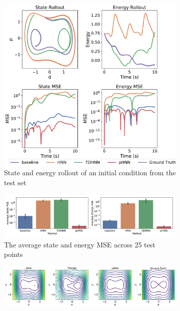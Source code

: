 \documentclass{article}
\begin{document}
\begin{figure}[!htb]
\centering
\captionsetup{justification=centering}
\begin{subfigure}[b]{0.48\textwidth}
\includegraphics[width=\textwidth]{figures/figures/duffing/1/duffing_long_0.pdf}
\caption{State and energy rollout of an initial condition from the test set}
\end{subfigure}
\begin{subfigure}[b]{0.48\textwidth}
\includegraphics[width=\textwidth]{figures/figures/duffing/1/duffing_errors_0.pdf}
\caption{The average state and energy MSE across 25 test points}
\end{subfigure}
\begin{subfigure}[b]{0.48\textwidth}
\includegraphics[width=\textwidth]{figures/figures/duffing/1/duffing_hamiltonian_0.pdf}

\end{subfigure}
\end{figure}
\end{document}
